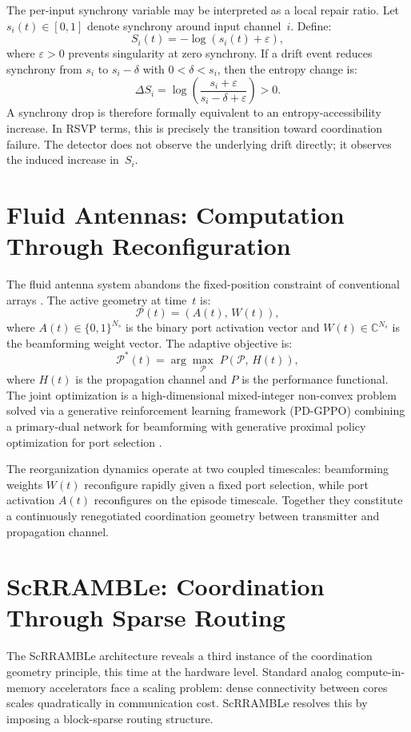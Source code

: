 \documentclass[11pt, a4paper]{article}
\theoremstyle{definition}
\theoremstyle{remark}
\begin{document}
The per-input synchrony variable may be interpreted as a local repair ratio.
Let $s_i(t) \in [0,1]$ denote synchrony around input channel~$i$. Define:
\[
S_i(t) = -\log(s_i(t) + \varepsilon),
\]
where $\varepsilon > 0$ prevents singularity at zero synchrony. If a drift
event reduces synchrony from $s_i$ to $s_i - \delta$ with $0 < \delta < s_i$,
then the entropy change is:
\[
\Delta S_i = \log\!\left(\frac{s_i + \varepsilon}{s_i - \delta + \varepsilon}\right) > 0.
\]
A synchrony drop is therefore formally equivalent to an entropy-accessibility
increase. In RSVP terms, this is precisely the transition toward coordination
failure. The detector does not observe the underlying drift directly; it
observes the induced increase in~$S_i$.

\section{Fluid Antennas: Computation Through Reconfiguration}

The fluid antenna system abandons the fixed-position constraint of
conventional arrays \cite{wong2020, wong2024}. The active geometry at
time~$t$ is:
\[
\mathcal{P}(t) = (A(t),\, W(t)),
\]
where $A(t) \in \{0,1\}^{N_s}$ is the binary port activation vector and
$W(t) \in \mathbb{C}^{N_s}$ is the beamforming weight vector. The adaptive
objective is:
\[
\mathcal{P}^*(t) = \arg\max_{\mathcal{P}}\; P(\mathcal{P},\, H(t)),
\]
where $H(t)$ is the propagation channel and $P$ is the performance
functional. The joint optimization is a high-dimensional mixed-integer
non-convex problem solved via a generative reinforcement learning framework
(PD-GPPO) combining a primary-dual network for beamforming with generative
proximal policy optimization for port selection \cite{zhang2026}.

The reorganization dynamics operate at two coupled timescales: beamforming
weights $W(t)$ reconfigure rapidly given a fixed port selection, while port
activation $A(t)$ reconfigures on the episode timescale. Together they
constitute a continuously renegotiated coordination geometry between
transmitter and propagation channel.

\section{ScRRAMBLe: Coordination Through Sparse Routing}

The ScRRAMBLe architecture \cite{jaltare2026} reveals a third instance of
the coordination geometry principle, this time at the hardware level.
Standard analog compute-in-memory accelerators face a scaling problem:
dense connectivity between cores scales quadratically in communication cost.
ScRRAMBLe resolves this by imposing a block-sparse routing structure.
\end{document}

